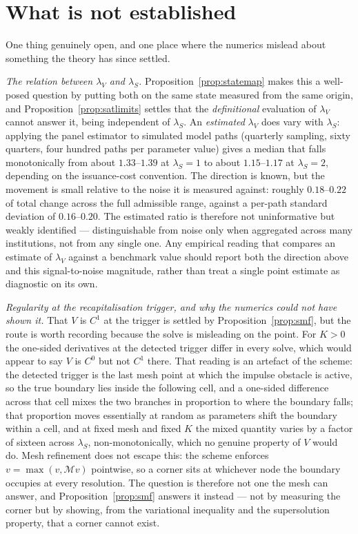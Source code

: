 \documentclass[11pt]{article}
\theoremstyle{remark}
\begin{document}
\section{What is not established}
\label{sec:open}

One thing genuinely open, and one place where the numerics mislead about
something the theory has since settled.

\emph{The relation between $\lambda_V$ and $\lambda_S$.}
Proposition~\ref{prop:statemap} makes this a well-posed question by
putting both on the same state measured from the same origin, and
Proposition~\ref{prop:satlimits} settles that the \emph{definitional}
evaluation of $\lambda_V$ cannot answer it, being independent of
$\lambda_S$. An \emph{estimated} $\lambda_V$ does vary with $\lambda_S$: applying the
panel estimator to simulated model paths (quarterly sampling, sixty
quarters, four hundred paths per parameter value) gives a median that
falls monotonically from about $1.33$--$1.39$ at $\lambda_S=1$ to about
$1.15$--$1.17$ at $\lambda_S=2$, depending on the issuance-cost
convention. The direction is known, but the movement is small relative to
the noise it is measured against: roughly $0.18$--$0.22$ of total change
across the full admissible range, against a per-path standard deviation
of $0.16$--$0.20$. The estimated ratio is therefore not uninformative but
weakly identified --- distinguishable from noise only when aggregated
across many institutions, not from any single one. Any empirical reading
that compares an estimate of $\lambda_V$ against a benchmark value should
report both the direction above and this signal-to-noise magnitude,
rather than treat a single point estimate as diagnostic on its own.

\emph{Regularity at the recapitalisation trigger, and why the numerics
could not have shown it.} That $V$ is $C^1$ at the trigger is settled by
Proposition~\ref{prop:smf}, but the route is worth recording because the
solve is misleading on the point. For $K>0$ the one-sided derivatives at
the detected trigger differ in every solve, which would appear to say $V$
is $C^0$ but not $C^1$ there. That reading is an artefact of the scheme:
the detected trigger is the last mesh point at which the impulse obstacle
is active, so the true boundary lies inside the following cell, and a
one-sided difference across that cell mixes the two branches in proportion
to where the boundary falls; that proportion moves essentially at random
as parameters shift the boundary within a cell, and at fixed mesh and
fixed $K$ the mixed quantity varies by a factor of sixteen across
$\lambda_S$, non-monotonically, which no genuine property of $V$ would do.
Mesh refinement does not escape this: the scheme enforces
$v=\max(v,\mathcal{M}v)$ pointwise, so a corner sits at whichever node the
boundary occupies at every resolution. The question is therefore not one
the mesh can answer, and Proposition~\ref{prop:smf} answers it instead ---
not by measuring the corner but by showing, from the variational
inequality and the supersolution property, that a corner cannot exist.
\end{document}
